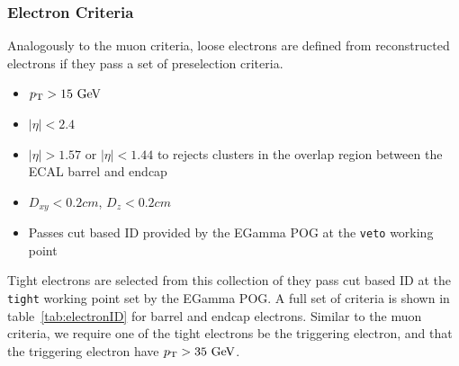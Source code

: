 \subsubsection{Electron Criteria} \label{sec:ana_electrons}
Analogously to the muon criteria, loose electrons are defined from reconstructed electrons if they pass a set of preselection criteria. 
\begin{itemize}
	\item $\pt>15\unit{GeV}$
	\item $|\eta|<2.4$
	\item $|\eta|>1.57\text{ or }|\eta|<1.44$ to rejects clusters in the overlap region between the ECAL barrel and endcap
	\item $D_{xy}<0.2\unit{cm}$, $D_{z}<0.2\unit{cm}$
	\item Passes cut based ID provided by the EGamma POG at the \texttt{veto} working point
\end{itemize}
Tight electrons are selected from this collection of they pass cut based ID at the \texttt{tight} working point set by the EGamma POG. A full set of criteria is shown in table~\ref{tab:electronID} for barrel and endcap electrons. Similar to the muon criteria, we require one of the tight electrons be the triggering electron, and that the triggering electron have $\pt>35\unit{GeV}$.


